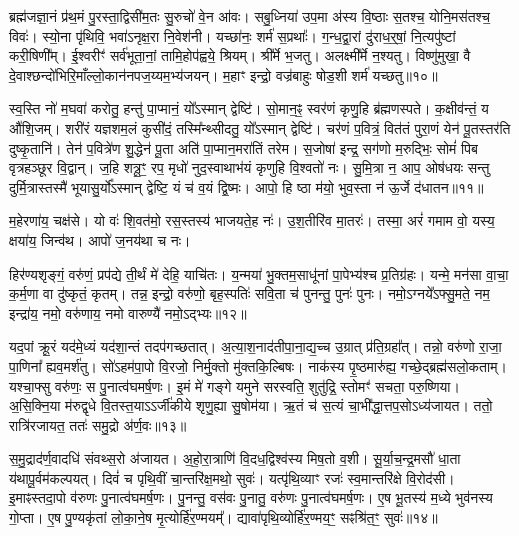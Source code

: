 ब्रह्म॑जज्ञा॒नं प्र॑थ॒मं पु॒रस्ता॒द्विसी॑म॒तः सु॒रुचो॑ वे॒न आ॑वः। 
सबु॒ध्निया॑ उप॒मा अ॑स्य वि॒ष्ठाः स॒तश्च॒ योनि॒मस॑तश्च॒ विवः॑। 
स्यो॒ना पृ॑थिवि॒ भवा॑ऽनृक्ष॒रा नि॒वेश॑नी। 
यच्छा॑नः॒ शर्म॑ स॒प्रथाः᳚। 
ग॒न्ध॒द्वा॒रां दु॑राध॒र्॒‌षां॒ नि॒त्यपु॑ष्टां करी॒षिणी᳚म्। 
ई॒श्वरीꣳ॑ सर्व॑भूता॒नां॒ तामि॒होप॑ह्वये॒ श्रियम्। 
श्री᳚र्मे भ॒जतु। 
अलक्ष्मी᳚र्मे न॒श्यतु। 
विष्णु॑मुखा॒ वै दे॒वाश्छन्दो॑भिरि॒माँल्लो॒कान॑नप\-ज॒य्यम॒भ्य॑जयन्। 
म॒हाꣳ इन्द्रो॒ वज्र॑बाहुः षोड॒शी शर्म॑ यच्छतु॥१०॥

स्व॒स्ति नो॑ म॒घवा॑ करोतु॒ हन्तु॑ पा॒प्मानं॒ यो᳚ऽस्मान् द्वेष्टि॑। 
सो॒मान॒ꣴ॒ स्वर॑णं कृणु॒हि ब्र॑ह्मणस्पते। 
क॒क्षीव॑न्तं॒ य औ॑शि॒जम्। 
शरी॑रं यज्ञशम॒लं कुसी॑दं॒ तस्मि᳚न्थ्सीदतु॒ यो᳚ऽस्मान् द्वेष्टि॑। 
चर॑णं प॒वित्रं॒ वित॑तं पुरा॒णं येन॑ पू॒तस्तर॑ति दुष्कृ॒तानि॑। 
तेन॑ प॒वित्रे॑ण शु॒द्धेन॑ पू॒ता अति॑ पा॒प्मान॒मरा॑तिं तरेम। 
स॒जोषा॑ इन्द्र॒ सग॑णो म॒रुद्भिः॒ सोमं॑ पिब वृत्रहञ्छूर वि॒द्वान्। 
ज॒हि शत्रू॒ꣳ॒ रप॒ मृधो॑ नुद॒स्वाथाभ॑यं कृणुहि वि॒श्वतो॑ नः। 
सु॒मि॒त्रा न॒ आप॒ ओष॑धयः सन्तु दुर्मि॒त्रास्तस्मै॑ भूयासु॒र्यो᳚ऽस्मान् द्वेष्टि॒ यं च॑ व॒यं द्वि॒ष्मः। 
आपो॒ हि ष्ठा म॑यो॒ भुव॒स्ता न॑ ऊ॒र्जे द॑धातन॥११॥

म॒हेरणा॑य॒ चक्ष॑से। 
यो वः॑ शि॒वत॑मो॒ रस॒स्तस्य॑ भाजयते॒ह नः॑। 
उ॒श॒तीरि॑व मा॒तरः॑। 
तस्मा॒ अरं॑ गमाम वो॒ यस्य॒ क्षया॑य॒ जिन्व॑थ। 
आपो॑ ज॒नय॑था च नः।


हिर॑ण्यशृङ्गं॒ वरु॑णं॒ प्रप॑द्ये ती॒र्थं मे॑ देहि॒ याचि॑तः। 
य॒न्मया॑ भु॒क्तम॒साधू॑नां पा॒पेभ्य॑श्च प्र॒तिग्र॑हः। 
यन्मे॒ मन॑सा वा॒चा॒ क॒र्म॒णा वा दु॑ष्कृतं॒ कृतम्। 
तन्न॒ इन्द्रो॒ वरु॑णो॒ बृह॒स्पतिः॑ सवि॒ता च॑ पुनन्तु॒ पुनः॑ पुनः। 
नमो॒ऽग्नये᳚ऽफ्सु॒मते॒ नम॒ इन्द्रा॑य॒ नमो॒ वरु॑णाय॒ नमो वारुण्यै॑ नमो॒ऽद्भ्यः॥१२॥

यद॒पां क्रू॒रं यद॑मे॒ध्यं यद॑शा॒न्तं तदप॑गच्छतात्। 
अ॒त्या॒श॒नाद॑ती\-पा॒ना॒द्य॒च्च उ॒ग्रात् प्र॑ति॒ग्रहा᳚त्। 
तन्नो॒ वरु॑णो रा॒जा॒ पा॒णिना᳚ ह्यव॒मर्\mbox{}श॑तु। 
सो॑ऽहम॑पा॒पो वि॒रजो॒ निर्मु॒क्तो मु॑क्तकि॒ल्बिषः। 
नाक॑स्य पृ॒ष्ठमारु॑ह्य॒ गच्छे॒द्ब्रह्म॑सलो॒कताम्। 
यश्चा॒फ्सु वरु॑णः॒ स पु॒नात्व॑घमर्\mbox{}ष॒णः। 
इ॒मं मे॑ गङ्गे यमुने सरस्वति॒ शुतु॑द्रि॒ स्तोमꣳ॑ सचता॒ परु॒ष्णिया। 
अ॒सि॒क्नि॒या म॑रुद्\mbox{}वृधे वि॒तस्त॒याऽऽर्जी॑कीये शृणु॒ह्या सु॒षोम॑या। 
ऋ॒तं च॑ स॒त्यं चा॒भी᳚द्धा॒त्तप॒सोऽध्य॑जायत। 
ततो॒ रात्रि॑रजायत॒ ततः॑ समु॒द्रो अ॑र्ण॒वः॥१३॥

स॒मु॒द्राद॑र्ण॒वादधि॑ संवथ्स॒रो अ॑जायत। 
अ॒हो॒रा॒त्राणि॑ वि॒दध॒द्विश्व॑स्य मिष॒तो व॒शी। 
सू॒र्या॒च॒न्द्र॒मसौ॑ धा॒ता य॑थापू॒र्वम॑\-कल्प\-यत्। 
दिवं॑ च पृथि॒वीं चा॒न्तरि॑क्ष॒मथो॒ सुवः॑। 
यत्पृ॑थि॒व्याꣳ रजः॑ स्व॒मान्तरि॑क्षे वि॒रोद॑सी। 
इ॒माꣴस्तदा॒पो व॑रुणः पु॒नात्व॑घमर्\mbox{}ष॒णः। 
पु॒नन्तु॒ वस॑वः पु॒नातु॒ वरु॑णः पु॒नात्व॑घमर्\mbox{}ष॒णः। 
ए॒ष भू॒तस्य॑ म॒ध्ये भुव॑नस्य गो॒प्ता। 
ए॒ष पु॒ण्यकृ॑तां लो॒का॒ने॒ष मृ॒त्योर्\mbox{}हि॑र॒ण्मयम्᳚। 
द्यावा॑पृथि॒व्योर्\mbox{}हि॑र॒ण्मय॒ꣳ॒ सꣴश्रि॑त॒ꣳ॒ सुवः॑॥१४॥

